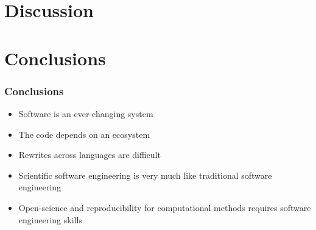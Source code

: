 \documentclass[%
        hyperref={%
                pdfauthor={Zakariyya Mughal},%
                pdfpagemode={None},pdfpagelayout={SinglePage}},%
        xcolor={x11names}%
]{beamer}
\begin{document}
\section{Discussion}

\section{Conclusions}

\begin{frame}
\frametitle{Conclusions}
\begin{itemize}
	\item Software is an ever-changing system
	\item The code depends on an ecosystem
	\item Rewrites across languages are difficult
	\item Scientific software engineering is very much like traditional software engineering
	\item Open-science and reproducibility for computational methods requires software engineering skills
\end{itemize}
\end{frame}
\end{document}
